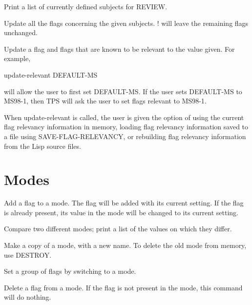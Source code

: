\begin{description}
\item[SUBJECTS]  
Print a list of currently defined subjects for REVIEW.

\item[UPDATE]  
Update all the flags concerning the given subjects. ! will
leave the remaining flags unchanged.

\item[UPDATE-RELEVANT]  
Update a flag and flags that are known to be relevant to the value given.
For example,

update-relevant DEFAULT-MS

will allow the user to first set DEFAULT-MS.  If the user sets DEFAULT-MS to MS98-1,
then TPS will ask the user to set flags relevant to MS98-1.

When update-relevant is called, the user is given the option of using the current
flag relevancy information in memory, loading flag relevancy information saved to
a file using SAVE-FLAG-RELEVANCY, or rebuilding flag relevancy information from
the Lisp source files.
\item
\end{description}

\section{Modes}

\begin{description} 
\item[ADD-FLAG-TO-MODE]  
Add a flag to a mode. The flag will be added with its
current setting. If the flag is already present, its value in the
mode will be changed to its current setting.

\item[COMPARE-MODES]  
Compare two different modes; print a list of the values on 
which they differ.

\item[COPY-MODE]  
Make a copy of a mode, with a new name. To delete the
old mode from memory, use DESTROY.

\item[MODE]  
Set a group of flags by switching to a mode.

\item[REMOVE-FLAG-FROM-MODE]  
Delete a flag from a mode. If the flag is not present
in the mode, this command will do nothing.
\item
\end{description}

